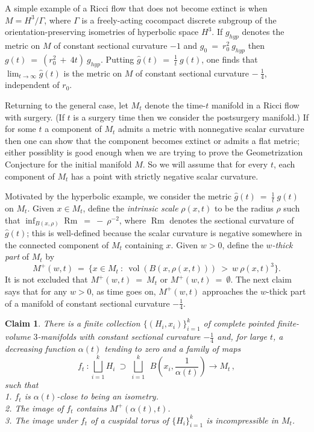 \documentclass[12pt]{amsart}
\newcommand{\Rm}{\operatorname{Rm}}
\newcommand{\vol}{\operatorname{vol}}
\numberwithin{equation}{section}
\theoremstyle{plain}
\newtheorem{claim}[equation]{Claim}
\theoremstyle{definition}
\theoremstyle{remark}
\begin{document}
A simple example of a Ricci flow that does not become extinct is when
$M = H^3/\Gamma$, where $\Gamma$ is a freely-acting cocompact discrete subgroup
of the orientation-preserving isometries of hyperbolic space $H^3$. If
$g_{hyp}$ denotes the metric on $M$ of constant sectional curvature
$-1$ and $g_0 \: = \: r_0^2 \: g_{hyp}$ then
$g(t) \: = \: (r_0^2 \: + \: 4t) \: g_{hyp}$. Putting 
$\widehat{g}(t) \: = \: \frac{1}{t} \: g(t)$, one finds that
$\lim_{t \rightarrow \infty} \widehat{g}(t)$ is the metric on $M$
of constant sectional curvature $- \: \frac14$, independent of
$r_0$.

Returning to the general case,
let $M_t$ denote the time-$t$ manifold in a Ricci flow with surgery.
(If $t$ is a surgery time
then we consider the postsurgery manifold.)
If for some $t$
a component of
$M_t$ admits a metric with
nonnegative scalar curvature then one can show  that
the component becomes extinct or admits a flat metric; either possiblity
is good enough when we are trying to prove the Geometrization
Conjecture for the initial manifold $M$.
So we will assume
that for every  $t$, each component of $M_t$ has a point with strictly
negative scalar curvature.


Motivated by the hyperbolic
example, we consider the metric $\widehat{g}(t) \: = \: \frac{1}{t} \: g(t)$
on $M_t$. Given $x \in M_t$, define the {\em intrinsic scale} $\rho(x,t)$ to be 
the radius $\rho$ such that $\inf_{B(x,\rho)} \Rm \: = \: - \: \rho^{-2}$,
where $\Rm$ denotes the sectional curvature of $\widehat{g}(t)$; this
is well-defined because the scalar curvature is negative somewhere in 
the connected component of $M_t$ containing $x$.
Given $w > 0$, define the
{\em $w$-thick part} of $M_t$ by 
\begin{equation}
M^+(w,t) \: = \:
\{ x \in M_t \: : \: \vol(B(x, \rho(x,t))) \: > \: w \: \rho(x,t)^3 \}.
\end{equation}
It is not excluded that $M^+(w,t) \: = \: M_t$ or $M^+(w,t) \: = \:
\emptyset$.
The next claim says that for any $w > 0$, as time goes on,
$M^+(w,t)$ approaches the $w$-thick part of a manifold of
constant sectional curvature $- \frac14$.

\begin{claim} \cite{Perelman2} \label{introclaim5}
There is a finite collection
$\{ (H_i, x_i) \}_{i=1}^k$ of complete pointed finite-volume $3$-manifolds
with constant sectional curvature $- \frac14$ and, for large $t$,
a decreasing function $\alpha(t)$ tending to zero and a family
of maps 
\begin{equation}
f_t \: : \bigsqcup_{i=1}^k H_i\:\supset\: \bigsqcup_{i=1}^k 
\:\:B \left( x_i, \frac{1}{\alpha(t)} \right)
 \rightarrow M_t\,, 
\end{equation}
such that\\
1. $f_t$ is $\alpha(t)$-close to being an isometry. \\
2. The image of $f_t$ contains $M^+(\alpha(t), t)$.\\
3. The image under $f_t$ of a cuspidal torus of
$\{H_i\}_{i=1}^k$ is incompressible in $M_t$.
\end{claim} 
\end{document}
